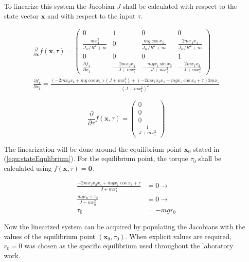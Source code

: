 \documentclass[a4paper, titlepage]{article}
\begin{document}
To linearize this system the Jacobian $J$ shall be calculated with respect to the state vector $\textbf{x}$ and with respect to the input $\tau$.

\begin{equation}
\begin{split}
\frac{\partial}{\partial \textbf{x}}f(\textbf{x}, \tau) = 
\begin{pmatrix}
0 & 1 & 0 & 0 \\
\frac{mx_4^2}{J_R/R^2 + m} & 0 & \frac{mg\cos{x_3}}{J_R/R^2 + m} & \frac{2mx_1x_4}{J_R/R^2 + m} \\
0 & 0 & 0 & 1 \\
\frac{\partial f_4}{\partial x_1} & -\frac{2mx_1x_4}{J + mx_1^2} & -\frac{mgx_1\sin{x_3}}{J + mx_1^2} & -\frac{2mx_1x_2}{J + mx_1^2}
\end{pmatrix} \\
\frac{\partial f_4}{\partial x_1} = \frac{(-2mx_2x_4 + mg\cos{x_3})(J + mx_1^2) + (-2mx_1x_2x_4 + mgx_1\cos{x_3} + \tau)2mx_1}{(J + mx_1^2)^2}
\end{split}
\label{stateJacobian}
\end{equation}

\begin{equation}
\frac{\partial}{\partial \tau}f(\textbf{x}, \tau) = 
\begin{pmatrix}
0 \\ 0 \\ 0 \\ \frac{1}{J + mx_1^2}
\end{pmatrix}
\label{equ:inputJacobian}
\end{equation}

The linearization will be done around the equilibrium point $\textbf{x}_0$ stated in (\ref{equ:stateEqulibrium}).
For the equilibrium point, the torque $\tau_0$ shall be calculated using $f(\textbf{x}, \tau) = \textbf{0}$.

\begin{equation}
\begin{split}
\frac{-2mx_1x_2x_4 + mgx_1\cos{x_3} + \tau}{J + mx_1^2} &= 0 \rightarrow \\
\frac{mgr_0 + \tau_0}{J + mr_0^2} &= 0 \rightarrow \\
\tau_0 &= -mgr_0
\end{split}
\end{equation}

Now the linearized system can be acquired by populating the Jacobians with the values of the equilibrium point $(\textbf{x}_0, \tau_0)$.
When explicit values are required, $r_0 = 0$ was chosen as the specific equilibrium used throughout the laboratory work.
\end{document}

